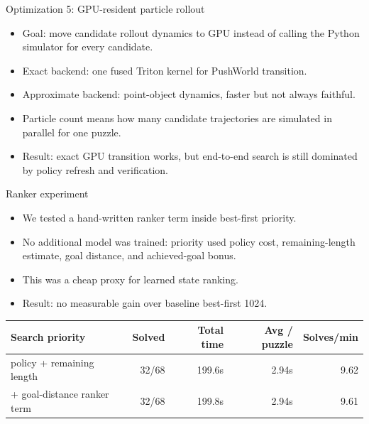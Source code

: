 \documentclass[aspectratio=169]{beamer}
\begin{document}
\begin{frame}{Optimization 5: GPU-resident particle rollout}
  \small
  \begin{itemize}
    \item Goal: move candidate rollout dynamics to GPU instead of calling the Python simulator for every candidate.
    \item Exact backend: one fused Triton kernel for PushWorld transition.
    \item Approximate backend: point-object dynamics, faster but not always faithful.
    \item Particle count means how many candidate trajectories are simulated in parallel for one puzzle.
    \item Result: exact GPU transition works, but end-to-end search is still dominated by policy refresh and verification.
  \end{itemize}

  \vspace{0.45em}
  \centering

\end{frame}

\begin{frame}{Ranker experiment}
  \small
  \begin{itemize}
    \item We tested a hand-written ranker term inside best-first priority.
    \item No additional model was trained: priority used policy cost, remaining-length estimate, goal distance, and achieved-goal bonus.
    \item This was a cheap proxy for learned state ranking.
    \item Result: no measurable gain over baseline best-first 1024.
  \end{itemize}

  \vspace{0.6em}
  \centering
  \begin{tabular}{@{}lrrrr@{}}
    \toprule
    Search priority & Solved & Total time & Avg / puzzle & Solves/min \\
    \midrule
    policy + remaining length & 32/68 & 199.6s & 2.94s & 9.62 \\
    + goal-distance ranker term & 32/68 & 199.8s & 2.94s & 9.61 \\
    \bottomrule
  \end{tabular}
\end{frame}
\end{document}
